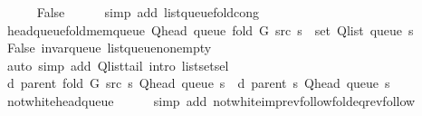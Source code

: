 \begin{isabellebody}
\ \ \ \ \isamarkupfalse%
\ False\isanewline
\ \ \ \ \isamarkupfalse%
\ {\isacharparenleft}{\kern0pt}simp\ add{\isacharcolon}{\kern0pt}\ list{\isacharunderscore}{\kern0pt}queue{\isacharunderscore}{\kern0pt}fold{\isacharunderscore}{\kern0pt}cong{\isacharparenright}{\kern0pt}\isanewline
\ \ \isamarkupfalse%
\ head{\isacharunderscore}{\kern0pt}queue{\isacharunderscore}{\kern0pt}fold{\isacharunderscore}{\kern0pt}mem{\isacharunderscore}{\kern0pt}queue{\isacharcolon}{\kern0pt}\ {\isachardoublequoteopen}Q{\isacharunderscore}{\kern0pt}head\ {\isacharparenleft}{\kern0pt}queue\ {\isacharparenleft}{\kern0pt}fold\ G\ src\ s{\isacharparenright}{\kern0pt}{\isacharparenright}{\kern0pt}\ {\isasymin}\ set\ {\isacharparenleft}{\kern0pt}Q{\isacharunderscore}{\kern0pt}list\ {\isacharparenleft}{\kern0pt}queue\ s{\isacharparenright}{\kern0pt}{\isacharparenright}{\kern0pt}{\isachardoublequoteclose}\isanewline
\ \ \ \ \isamarkupfalse%
\ False\ invar{\isacharunderscore}{\kern0pt}queue\ list{\isacharunderscore}{\kern0pt}queue{\isacharunderscore}{\kern0pt}non{\isacharunderscore}{\kern0pt}empty\isanewline
\ \ \ \ \isamarkupfalse%
\ {\isacharparenleft}{\kern0pt}auto\ simp\ add{\isacharcolon}{\kern0pt}\ Q{\isachardot}{\kern0pt}list{\isacharunderscore}{\kern0pt}tail\ intro{\isacharcolon}{\kern0pt}\ list{\isachardot}{\kern0pt}set{\isacharunderscore}{\kern0pt}sel{\isacharparenleft}{\kern0pt}{}{\isacharparenright}{\kern0pt}{\isacharparenright}{\kern0pt}\isanewline
\isanewline
\ \ \isamarkupfalse%
\ {\isachardoublequoteopen}d\ {\isacharparenleft}{\kern0pt}parent\ {\isacharparenleft}{\kern0pt}fold\ G\ src\ s{\isacharparenright}{\kern0pt}{\isacharparenright}{\kern0pt}\ {\isacharparenleft}{\kern0pt}Q{\isacharunderscore}{\kern0pt}head\ {\isacharparenleft}{\kern0pt}queue\ s{\isacharparenright}{\kern0pt}{\isacharparenright}{\kern0pt}\ {\isacharequal}{\kern0pt}\ d\ {\isacharparenleft}{\kern0pt}parent\ s{\isacharparenright}{\kern0pt}\ {\isacharparenleft}{\kern0pt}Q{\isacharunderscore}{\kern0pt}head\ {\isacharparenleft}{\kern0pt}queue\ s{\isacharparenright}{\kern0pt}{\isacharparenright}{\kern0pt}{\isachardoublequoteclose}\isanewline
\ \ \ \ \isamarkupfalse%
\ not{\isacharunderscore}{\kern0pt}white{\isacharunderscore}{\kern0pt}head{\isacharunderscore}{\kern0pt}queue\isanewline
\ \ \ \ \isamarkupfalse%
\ {\isacharparenleft}{\kern0pt}simp\ add{\isacharcolon}{\kern0pt}\ not{\isacharunderscore}{\kern0pt}white{\isacharunderscore}{\kern0pt}imp{\isacharunderscore}{\kern0pt}rev{\isacharunderscore}{\kern0pt}follow{\isacharunderscore}{\kern0pt}fold{\isacharunderscore}{\kern0pt}eq{\isacharunderscore}{\kern0pt}rev{\isacharunderscore}{\kern0pt}follow{\isacharparenright}{\kern0pt}\isanewline

\end{isabellebody}
